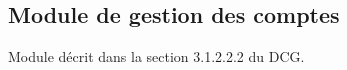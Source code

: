 \documentclass[10pt,a4paper]{report}
\begin{document}
\newpage

\subsection{Module de gestion des comptes}
Module décrit dans la section 3.1.2.2.2 du DCG.
\begin{center}
	\\
\end{center}
\end{document}
